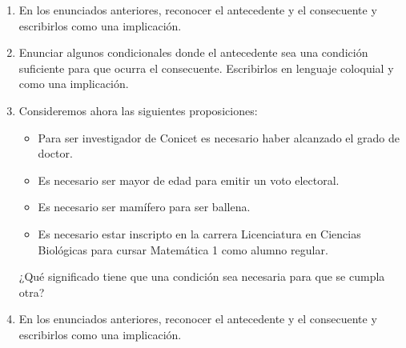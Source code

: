 \documentclass[12pt]{article}
\theoremstyle{definition}
\theoremstyle{remark}
\begin{document}
\begin{enumerate}
\item En los enunciados anteriores, reconocer el antecedente y el consecuente y escribirlos como una implicación.

\item Enunciar algunos condicionales donde el antecedente sea una condición suficiente para que ocurra el consecuente. Escribirlos en lenguaje coloquial y como una implicación.

\item Consideremos ahora las siguientes proposiciones:
\begin{itemize}
\setlength\itemsep{0em}
\item Para ser investigador de Conicet es necesario haber alcanzado el grado de doctor.
\item Es necesario ser mayor de edad para emitir un voto electoral.
\item Es necesario ser mamífero para ser ballena.
\item Es necesario estar inscripto en la carrera Licenciatura en Ciencias Biológicas para cursar Matemática 1 como alumno regular.
\end{itemize}
¿Qué significado tiene que una condición sea necesaria para que se cumpla otra? 

\item En los enunciados anteriores, reconocer el antecedente y el consecuente y escribirlos como una implicación.


\end{enumerate}
\end{document}
